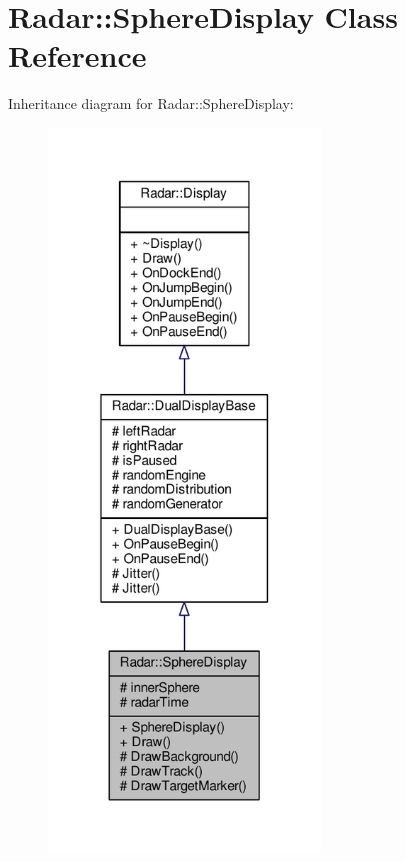 \hypertarget{classRadar_1_1SphereDisplay}{}\section{Radar\+:\+:Sphere\+Display Class Reference}
\label{classRadar_1_1SphereDisplay}


Inheritance diagram for Radar\+:\+:Sphere\+Display\+:
\nopagebreak
\begin{figure}[H]
\begin{center}
\leavevmode
\includegraphics[width=205pt]{d2/de2/classRadar_1_1SphereDisplay__inherit__graph}
\end{center}
\end{figure}


